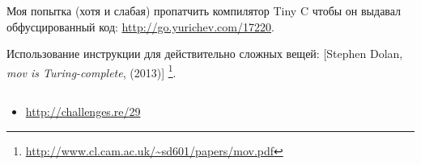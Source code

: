 Моя попытка (хотя и слабая) пропатчить компилятор Tiny C чтобы он выдавал обфусцированный код:
\url{http://go.yurichev.com/17220}.

Использование инструкции \MOV для действительно сложных вещей: 
[Stephen Dolan, \emph{mov is Turing-complete}, (2013)]
\footnote{\AlsoAvailableAs \url{http://www.cl.cam.ac.uk/~sd601/papers/mov.pdf}}. 

\subsection{\Exercise}

\begin{itemize}
	\item \url{http://challenges.re/29}
\end{itemize}


